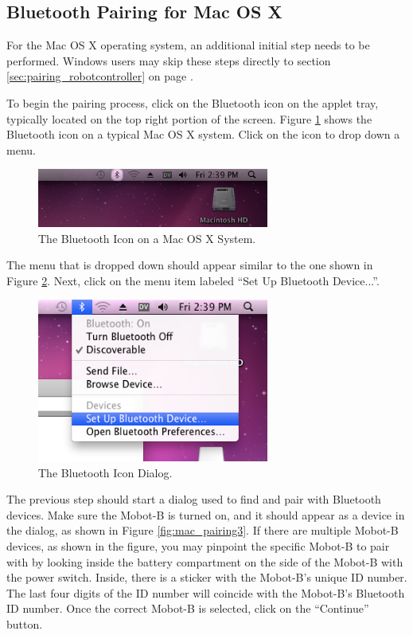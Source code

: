 \documentclass{article}
\begin{document}
\subsection{Bluetooth Pairing for Mac OS X}
For the Mac OS X operating system, an additional initial step needs to be performed.
Windows users may skip these steps directly to section \ref{sec:pairing_robotcontroller}
on page \pageref{sec:pairing_robotcontroller}.

To begin the pairing process, click on the Bluetooth icon on the applet tray,
typically located on the top right portion of the screen. Figure \ref{fig:mac_pairing1}
shows the Bluetooth icon on a typical Mac OS X system. Click on the icon to drop down
a menu.
\begin{figure}[H]
\begin{center}
\includegraphics[width=3in]{images/mac_pairing1.png}
\end{center}
\caption{\label{fig:mac_pairing1} The Bluetooth Icon on a Mac OS X System.}
\end{figure}

The menu that is dropped down should appear similar to the one shown in Figure \ref{fig:mac_pairing2}.
Next, click on the menu item labeled ``Set Up Bluetooth Device...''.
\begin{figure}[H]
\begin{center}
\includegraphics[width=3in]{images/mac_pairing2.png}
\end{center}
\caption{\label{fig:mac_pairing2} The Bluetooth Icon Dialog.}
\end{figure}

The previous step should start a dialog used to find and pair with Bluetooth devices. Make sure the
Mobot-B is turned on, and it should appear as a device in the dialog, as shown in Figure \ref{fig:mac_pairing3}.
If there are multiple Mobot-B devices, as shown in the figure, you may pinpoint the specific Mobot-B to pair
with by looking inside the battery compartment on the side of the Mobot-B with the power switch. Inside,
there is a sticker with the Mobot-B's unique ID number. The last four digits of the ID number will
coincide with the Mobot-B's Bluetooth ID number. Once the correct Mobot-B is selected, click on the ``Continue''
button.
\end{document}
